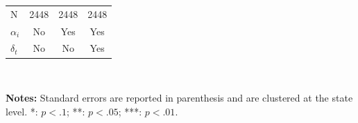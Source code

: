 \documentclass{article}
\begin{document}
\begin{center}
\begin{table}[hbtp!]
{\begin{tabular}{l|c|c|c|}
N                      & 2448    & 2448     & 2448        \\
$\alpha_i$                    & No       & Yes        & Yes            \\
$\delta_t$                 & No       & No        & Yes         
 \\\hline   
\end{tabular}
}\\[.5 em]
\begin{minipage}{\textwidth} %
\footnotesize{\textbf{Notes:} Standard errors are reported in parenthesis and are clustered at the state level. *: $p<.1$; **: $p<.05$; ***: $p<.01$.\par}
\end{minipage}

\end{table}
\end{center}
\end{document}
